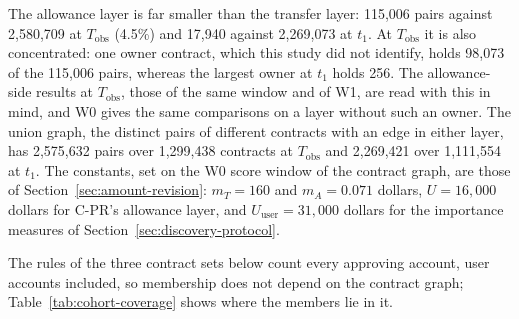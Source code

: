 

The allowance layer is far smaller than the transfer layer: 115,006 pairs against 2,580,709 at $T_{\mathrm{obs}}$ (4.5\%) and 17,940 against 2,269,073 at $t_1$. At $T_{\mathrm{obs}}$ it is also concentrated: one owner contract, which this study did not identify, holds 98,073 of the 115,006 pairs, whereas the largest owner at $t_1$ holds 256. The allowance-side results at $T_{\mathrm{obs}}$, those of the same window and of W1, are read with this in mind, and W0 gives the same comparisons on a layer without such an owner. The union graph, the distinct pairs of different contracts with an edge in either layer, has 2,575,632 pairs over 1,299,438 contracts at $T_{\mathrm{obs}}$ and 2,269,421 over 1,111,554 at $t_1$. The constants, set on the W0 score window of the contract graph, are those of Section~\ref{sec:amount-revision}: $m_T=160$ and $m_A=0.071$ dollars, $U=16{,}000$ dollars for \mbox{C-PR}'s allowance layer, and $U_{\mathrm{user}}=31{,}000$ dollars for the importance measures of Section~\ref{sec:discovery-protocol}.


The rules of the three contract sets below count every approving account, user accounts included, so membership does not depend on the contract graph; Table~\ref{tab:cohort-coverage} shows where the members lie in it.

